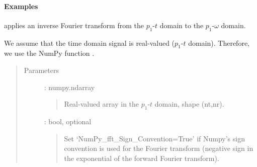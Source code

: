 \documentclass[letterpaper,10pt,english]{sphinxmanual}
\begin{document}
\begin{fulllineitems}
\begin{fulllineitems}
\paragraph{Examples}

%
\begin{sphinxVerbatim}[commandchars=\\\{\}]
     
\end{sphinxVerbatim}

\end{fulllineitems}


\begin{fulllineitems}
\label{\detokenize{Wavefield_NRM_p_w:Wavefield_NRM_p_w.Wavefield_NRM_p_w.PT2PW}}
applies an inverse Fourier transform from the \(p_1\)-\(t\) domain to the \(p_1\)-\(\omega\) domain.

We assume that the time domain signal is real-valued (\(p_1\)-\(t\) domain). Therefore, we use the NumPy function .
\begin{quote}\begin{description}
\item[{Parameters}] \leavevmode
{} : numpy.ndarray
\begin{quote}

Real-valued array in the \(p_1\)-\(t\) domain, shape (nt,nr).
\end{quote}

 : bool, optional
\begin{quote}

Set ‘NumPy\_fft\_Sign\_Convention=True’ if Numpy’s sign convention is used for the Fourier transform (negative sign in the exponential of the forward Fourier transform).
\end{quote}


\end{description}
\end{quote}
\end{fulllineitems}
\end{fulllineitems}
\end{document}
